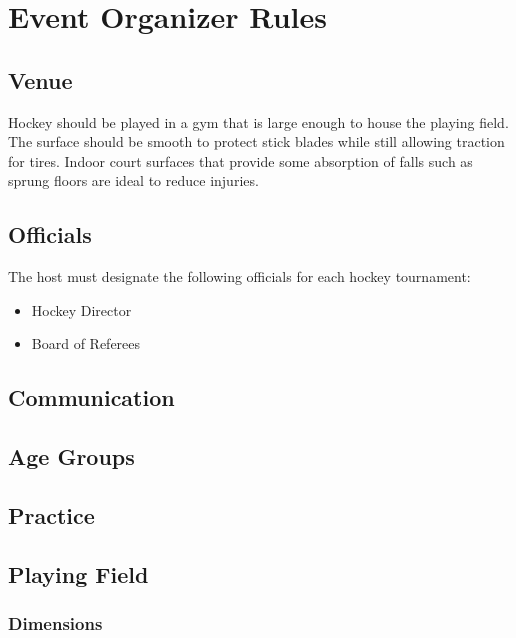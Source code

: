 \chapter{Event Organizer Rules}

\section{Venue}

Hockey should be played in a gym that is large enough to house the playing field.
The surface should be smooth to protect stick blades while still allowing traction for tires.
Indoor court surfaces that provide some absorption of falls such as sprung floors are ideal to reduce injuries.

\section{Officials}

The host must designate the following officials for each hockey tournament:
\begin{itemize}
\item Hockey Director
\item Board of Referees
\end{itemize}

\begin{comment2016}

\section{Communication}

\section{Age Groups}

\section{Practice}

\end{comment2016}

\section{Playing Field}

\subsection{Dimensions}

